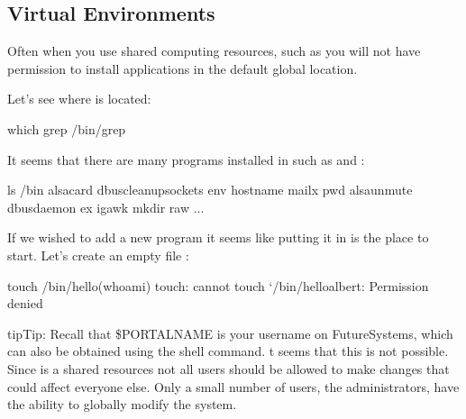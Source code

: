 \subsection{Virtual Environments}
\label{\detokenize{lesson/prg/python_intro:virtual-environments}}\label{\detokenize{lesson/prg/python_intro:id7}}
Often when you use shared computing resources, such as
 you will not have permission to install
applications in the default global location.

Let's see where  is located:

\begin{sphinxVerbatim}[commandchars=\\\{\}]
\PYGZdl{} which grep
/bin/grep
\end{sphinxVerbatim}

It seems that there are many programs installed in  such as
 and :

\begin{sphinxVerbatim}[commandchars=\\\{\}]
\PYGZdl{} ls /bin
alsacard    dbus\PYGZhy{}cleanup\PYGZhy{}sockets  env             hostname         mailx          pwd
alsaunmute  dbus\PYGZhy{}daemon           ex              igawk            mkdir          raw
...
\end{sphinxVerbatim}

If we wished to add a new program it seems like putting it in 
is the place to start.  Let's create an empty file
:

\begin{sphinxVerbatim}[commandchars=\\\{\}]
\PYGZdl{} touch /bin/hello\PYGZhy{}\PYGZdl{}(whoami)
touch: cannot touch {}`/bin/hello\PYGZhy{}albert\PYGZsq{}: Permission denied
\end{sphinxVerbatim}

\begin{sphinxadmonition}{tip}{Tip:}
Recall that \$PORTALNAME is your username on FutureSystems, which
can also be obtained using the  shell command.  t seems
that this is not possible.  Since  is a shared resources
not all users should be allowed to make changes that could affect
everyone else.  Only a small number of users, the administrators,
have the ability to globally modify the system.
\end{sphinxadmonition}

